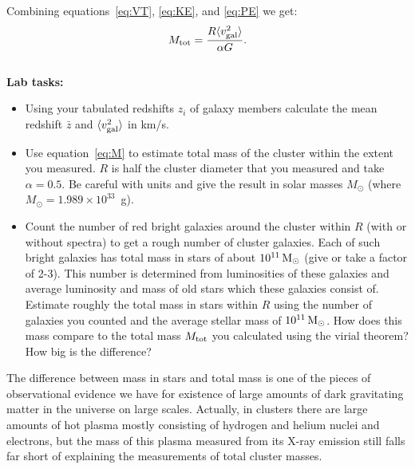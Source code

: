 \documentclass[12pt]{article}
\begin{document}
Combining equations~\ref{eq:VT}, \ref{eq:KE}, and \ref{eq:PE} we get: 
\begin{equation}
M_{\rm tot}=\frac{R\langle v^2_{\rm gal} \rangle}{\alpha G}.
\label{eq:M}
\end{equation}
\\[2mm]

{\bf Lab tasks:} 

{\it 
\begin{itemize}
\item Using your tabulated redshifts $z_{i}$ of galaxy members calculate the mean redshift $\bar{z}$ 
and $\langle v^2_{\rm gal}\rangle$ in km/s. 
\item Use equation~\ref{eq:M} to estimate total mass of the cluster within the extent you measured. 
$R$ is half the cluster diameter that you measured and take $\alpha=0.5$. Be careful with units and 
give the result in solar masses $M_{\odot}$ (where $M_{\odot}=1.989\times 10^{33}$~g). 
\item Count the number of red bright galaxies around the cluster within $R$ (with or without spectra) 
to get a rough number of cluster galaxies. Each of such bright galaxies has total mass in stars
of about $10^{11}\,\rm M_{\odot}$ (give or take a factor of 2-3). This number is determined
from luminosities of these galaxies and average luminosity and mass of old stars
which these galaxies consist of. Estimate roughly the total mass
in stars within $R$ using the number of galaxies you counted and the average stellar mass
of $10^{11}\,\rm M_{\odot}$. How does this mass compare to the total mass $M_{\rm tot}$ you calculated
using the virial theorem? How big is the difference?
\end{itemize}
}

The difference between mass in stars and total mass is one of the pieces of observational
evidence we have for existence of large amounts of dark gravitating matter in the universe on large scales. 
Actually, in clusters there are large amounts of hot plasma mostly consisting of hydrogen and helium
nuclei and electrons, but the mass of this plasma measured from its X-ray emission still falls far short
of explaining the measurements of total cluster masses. 
\end{document}
